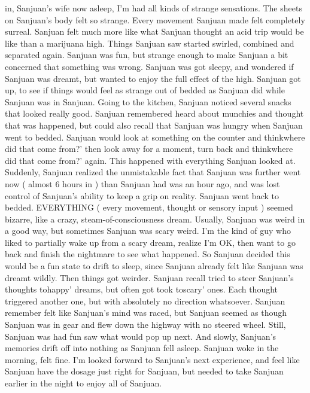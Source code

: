 \documentclass[12pt]{book}
\begin{document}
in, Sanjuan's wife now asleep, I'm had all kinds of strange sensations. The sheets on Sanjuan's body felt so strange. Every movement Sanjuan made felt completely surreal. Sanjuan felt much more like what Sanjuan thought an acid trip would be like than a marijuana high. Things Sanjuan saw started swirled, combined and separated again. Sanjuan was fun, but strange enough to make Sanjuan a bit concerned that something was wrong. Sanjuan was got sleepy, and wondered if Sanjuan was dreamt, but wanted to enjoy the full effect of the high. Sanjuan got up, to see if things would feel as strange out of bedded as Sanjuan did while Sanjuan was in Sanjuan. Going to the kitchen, Sanjuan noticed several snacks that looked really good. Sanjuan remembered heard about munchies and thought that was happened, but could also recall that Sanjuan was hungry when Sanjuan went to bedded. Sanjuan would look at something on the counter and thinkwhere did that come from?' then look away for a moment, turn back and thinkwhere did that come from?' again. This happened with everything Sanjuan looked at. Suddenly, Sanjuan realized the unmistakable fact that Sanjuan was further went now ( almost 6 hours in ) than Sanjuan had was an hour ago, and was lost control of Sanjuan's ability to keep a grip on reality. Sanjuan went back to bedded. EVERYTHING ( every movement, thought or sensory input ) seemed bizarre, like a crazy, steam-of-consciousness dream. Usually, Sanjuan was weird in a good way, but sometimes Sanjuan was scary weird. I'm the kind of guy who liked to partially wake up from a scary dream, realize I'm OK, then want to go back and finish the nightmare to see what happened. So Sanjuan decided this would be a fun state to drift to sleep, since Sanjuan already felt like Sanjuan was dreamt wildly. Then things got weirder. Sanjuan recall tried to steer Sanjuan's thoughts tohappy' dreams, but often got took toscary' ones. Each thought triggered another one, but with absolutely no direction whatsoever. Sanjuan remember felt like Sanjuan's mind was raced, but Sanjuan seemed as though Sanjuan was in gear and flew down the highway with no steered wheel. Still, Sanjuan was had fun saw what would pop up next. And slowly, Sanjuan's memories drift off into nothing as Sanjuan fell asleep. Sanjuan woke in the morning, felt fine. I'm looked forward to Sanjuan's next experience, and feel like Sanjuan have the dosage just right for Sanjuan, but needed to take Sanjuan earlier in the night to enjoy all of Sanjuan.
\end{document}
